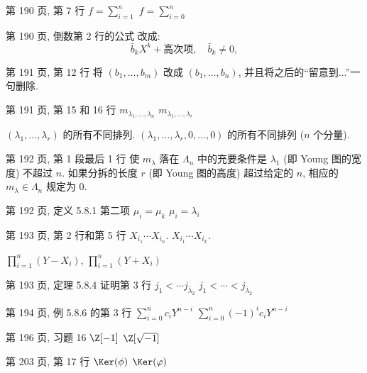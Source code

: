\documentclass{AJerrata}
\begin{document}
\begin{Errata}
		\item[第 190 页, 第 7 行]
		\Orig $f = \sum_{i=1}^n$
		\Corr $f = \sum_{i=0}^n$
		
		\item[第 190 页, 倒数第 2 行的公式]
		改成:
		\[ \bar{b}_k X^k + \text{高次项}, \quad \bar{b}_k \neq 0, \]

		\item[第 191 页, 第 12 行]
		将 $(b_1, \ldots, b_m)$ 改成 $(b_1, \ldots, b_n)$, 并且将之后的``留意到...''一句删除.
		
		\item[第 191 页, 第 15 和 16 行]
		\Orig $m_{\lambda_1, \ldots, \lambda_n}$
		\Corr $m_{\lambda_1, \ldots, \lambda_r}$
		
		\Orig $(\lambda_1, \ldots, \lambda_r)$ 的所有不同排列.
		\Corr $(\lambda_1, \ldots, \lambda_r, 0, \ldots, 0)$ 的所有不同排列 ($n$ 个分量).
		
		\item[第 192 页, 第 1 段最后 1 行]
		\Orig 使 $m_\lambda$ 落在 $\Lambda_n$ 中的充要条件是 $\lambda_1$ (即 Young 图的宽度) 不超过 $n$.
		\Corr 如果分拆的长度 $r$ (即 Young 图的高度) 超过给定的 $n$, 相应的 $m_\lambda \in \Lambda_n$ 规定为 $0$.
		
		\item[第 192 页, 定义 5.8.1 第二项]
		\Orig $\mu_i = \mu_k$
		\Corr $\mu_i = \lambda_i$
		
		\item[第 193 页, 第 2 行和第 5 行]
		\Orig $X_{i_1} \cdots X_{i_n}$.
		\Corr $X_{i_1} \cdots X_{i_k}$.
		
		\Orig $\prod_{i=1}^n (Y - X_i)$,
		\Corr $\prod_{i=1}^n (Y + X_i)$
		
		\item[第 193 页, 定理 5.8.4 证明第 3 行]
		\Orig $j_1 < \cdots j_{\bar{\lambda}_2}$
		\Corr $j_1 < \cdots < j_{\bar{\lambda}_2}$
				
		\item[第 194 页, 例 5.8.6 的第 3 行]
		\Orig $\sum_{i=0}^n c_i Y^{n-i}$
		\Corr $\sum_{i=0}^n (-1)^i c_i Y^{n-i}$
		
		\item[第 196 页, 习题 16]
		\Orig $\Z[-1]$
		\Corr $\Z[\sqrt{-1}]$
		
		\item[第 203 页, 第 17 行]
		\Orig $\Ker(\phi)$
		\Corr $\Ker(\varphi)$


\end{Errata}
\end{document}
